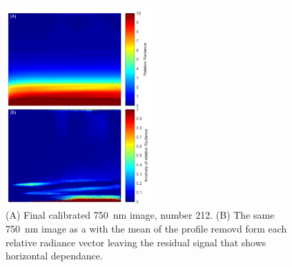 \documentclass[12pt]{article}
\begin{document}
\clearpage

\begin{figure}
    \begin{subfigure}[t]{0\textwidth}
        \label{fig:AfterImagesHorizontalDependance:a}
    \end{subfigure}
    \begin{subfigure}[t]{0\textwidth}
         \label{fig:AfterImagesHorizontalDependance:b}
    \end{subfigure}
    \includegraphics[width=0.50\textwidth]{./Images/5-2-AfterImage.pdf}
    \caption{(A) Final calibrated 750~nm image, number 212. (B) The same 750~nm image as a with the mean of the profile removd form each relative radiance vector leaving the residual signal that shows horizontal dependance.}
    \label{fig:AfterImagesHorizontalDependance}
\end{figure}

\clearpage
\end{document}

